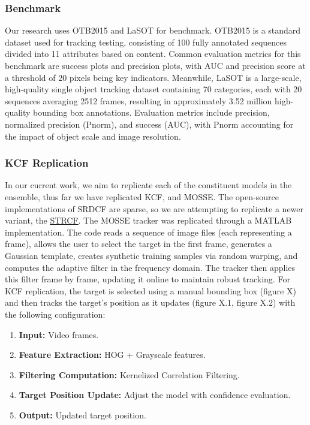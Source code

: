\documentclass{article}
\begin{document}
\subsubsection{Benchmark}

Our research uses OTB2015 and LaSOT for benchmark. OTB2015 is a standard dataset used for tracking testing, consisting of 100 fully annotated sequences divided into 11 attributes based on content. Common evaluation metrics for this benchmark are success plots and precision plots, with AUC and precision score at a threshold of 20 pixels being key indicators. Meanwhile, LaSOT is a large-scale, high-quality single object tracking dataset containing 70 categories, each with 20 sequences averaging 2512 frames, resulting in approximately 3.52 million high-quality bounding box annotations. Evaluation metrics include precision, normalized precision (Pnorm), and success (AUC), with Pnorm accounting for the impact of object scale and image resolution.


\subsubsection{KCF Replication}

In our current work, we aim to replicate each of the constituent models in the ensemble, thus far we have replicated KCF, and MOSSE. The open-source implementations of SRDCF are sparse, so we are attempting to replicate a newer variant, the \underline{\href{https://github.com/lifeng9472/STRCF}{STRCF}}. The MOSSE tracker was replicated through a MATLAB implementation. The code reads a sequence of image files (each representing a frame), allows the user to select the target in the first frame, generates a Gaussian template, creates synthetic training samples via random warping, and computes the adaptive filter in the frequency domain. The tracker then applies this filter frame by frame, updating it online to maintain robust tracking. For KCF replication, the target is selected using a manual bounding box (figure X) and then tracks the target's position as it updates (figure X.1, figure X.2) with the following configuration:

\begin{enumerate}
  \item \textbf{Input:} Video frames.
  \item \textbf{Feature Extraction:} HOG + Grayscale features.
  \item \textbf{Filtering Computation:} Kernelized Correlation Filtering.
  \item \textbf{Target Position Update:} Adjust the model with confidence evaluation.
  \item \textbf{Output:} Updated target position.
\end{enumerate}
\end{document}
